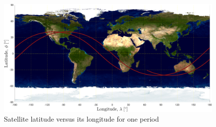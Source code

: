 \begin{figure}[H]
    \caption{Satellite latitude versus its longitude for one period}
    \centering
    \includegraphics[width=16cm]{../Figure/Q2/latlong_earth}
\end{figure}

